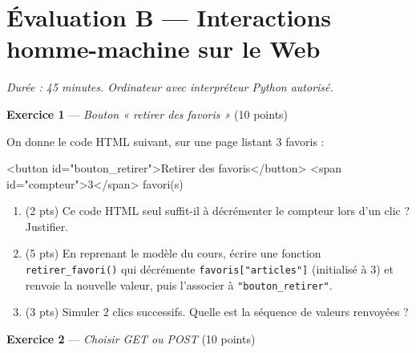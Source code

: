 \section*{Évaluation B --- Interactions homme-machine sur le Web}
\textit{Durée : 45 minutes. Ordinateur avec interpréteur Python autorisé.}


\bigskip

\textbf{Exercice 1} --- \textit{Bouton « retirer des favoris »} \hfill (10 points)

On donne le code HTML suivant, sur une page listant $3$ favoris :
\begin{console}
<button id="bouton_retirer">Retirer des favoris</button>
<span id="compteur">3</span> favori(s)
\end{console}

\begin{enumerate}
  \item (2 pts) Ce code HTML seul suffit-il à décrémenter le compteur lors d'un clic ? Justifier.
  \item (5 pts) En reprenant le modèle du cours, écrire une fonction \lstinline{retirer_favori()} qui décrémente \lstinline{favoris["articles"]} (initialisé à $3$) et renvoie la nouvelle valeur, puis l'associer à \lstinline{"bouton_retirer"}.
  \item (3 pts) Simuler $2$ clics successifs. Quelle est la séquence de valeurs renvoyées ?
\end{enumerate}


\bigskip

\textbf{Exercice 2} --- \textit{Choisir GET ou POST} \hfill (10 points)

